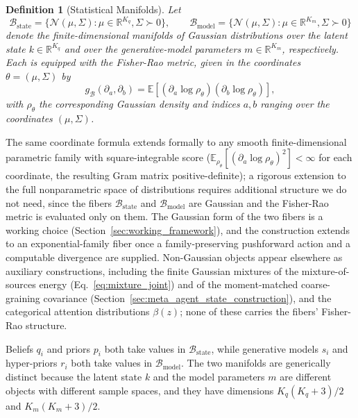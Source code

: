 \documentclass[11pt]{article}
\newtheorem{definition}{Definition}
\begin{document}
\begin{definition}[Statistical Manifolds]
Let
\begin{equation}
\mathcal{B}_{\mathrm{state}} = \{\mathcal{N}(\mu, \Sigma) : \mu \in \mathbb{R}^{K_q}, \Sigma \succ 0\},
\qquad
\mathcal{B}_{\mathrm{model}} = \{\mathcal{N}(\mu, \Sigma) : \mu \in \mathbb{R}^{K_m}, \Sigma \succ 0\}
\end{equation}
denote the finite-dimensional manifolds of Gaussian distributions over the latent state $k \in \mathbb{R}^{K_q}$ and over the generative-model parameters $m \in \mathbb{R}^{K_m}$, respectively. Each is equipped with the Fisher-Rao metric, given in the coordinates $\theta = (\mu, \Sigma)$ by
\begin{equation}
g_{\mathcal{B}}(\partial_a, \partial_b) = \mathbb{E}\left[(\partial_a \log \rho_\theta)(\partial_b \log \rho_\theta)\right],
\end{equation}
with $\rho_\theta$ the corresponding Gaussian density and indices $a, b$ ranging over the coordinates $(\mu, \Sigma)$.
\end{definition}

The same coordinate formula extends formally to any smooth finite-dimensional parametric family with square-integrable score ($\mathbb{E}_{\rho_\theta}[(\partial_a \log\rho_\theta)^2] < \infty$ for each coordinate, the resulting Gram matrix positive-definite); a rigorous extension to the full nonparametric space of distributions requires additional structure we do not need, since the fibers $\mathcal{B}_{\mathrm{state}}$ and $\mathcal{B}_{\mathrm{model}}$ are Gaussian and the Fisher-Rao metric is evaluated only on them. The Gaussian form of the two fibers is a working choice (Section~\ref{sec:working_framework}), and the construction extends to an exponential-family fiber once a family-preserving pushforward action and a computable divergence are supplied. Non-Gaussian objects appear elsewhere as auxiliary constructions, including the finite Gaussian mixtures of the mixture-of-sources energy (Eq.~\eqref{eq:mixture_joint}) and of the moment-matched coarse-graining covariance (Section~\ref{sec:meta_agent_state_construction}), and the categorical attention distributions $\beta(z)$; none of these carries the fibers' Fisher-Rao structure.

Beliefs $q_i$ and priors $p_i$ both take values in $\mathcal{B}_{\mathrm{state}}$, while generative models $s_i$ and hyper-priors $r_i$ both take values in $\mathcal{B}_{\mathrm{model}}$. The two manifolds are generically distinct because the latent state $k$ and the model parameters $m$ are different objects with different sample spaces, and they have dimensions $K_q(K_q+3)/2$ and $K_m(K_m+3)/2$.
\end{document}
